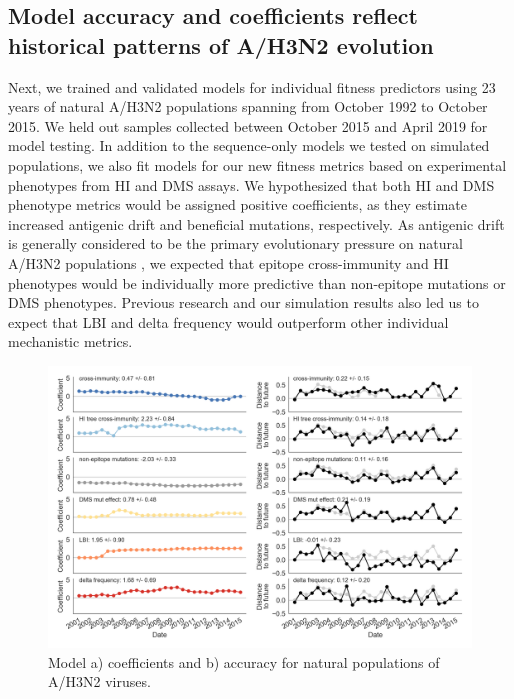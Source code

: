\subsection*{Model accuracy and coefficients reflect historical patterns of A/H3N2 evolution}

Next, we trained and validated models for individual fitness predictors using 23 years of natural A/H3N2 populations spanning from October 1992 to October 2015.
We held out samples collected between October 2015 and April 2019 for model testing.
In addition to the sequence-only models we tested on simulated populations, we also fit models for our new fitness metrics based on experimental phenotypes from HI and DMS assays.
We hypothesized that both HI and DMS phenotype metrics would be assigned positive coefficients, as they estimate increased antigenic drift and beneficial mutations, respectively.
As antigenic drift is generally considered to be the primary evolutionary pressure on natural A/H3N2 populations \cite{Smith:2004jc,Bedford:2014bf,Luksza:2014hj}, we expected that epitope cross-immunity and HI phenotypes would be individually more predictive than non-epitope mutations or DMS phenotypes.
Previous research \cite{Neher:2016hy} and our simulation results also led us to expect that LBI and delta frequency would outperform other individual mechanistic metrics.

\begin{figure}[t]
  \begin{center}
  \includegraphics[width=\textwidth]{figures/unadjusted-model-accuracy-and-coefficients-for-natural-populations.png}
  \caption{Model a) coefficients and b) accuracy for natural populations of A/H3N2 viruses.}
  \label{fig:unadjusted_model_accuracy_and_coefficients_for_natural_populations}
  \end{center}
\end{figure}

